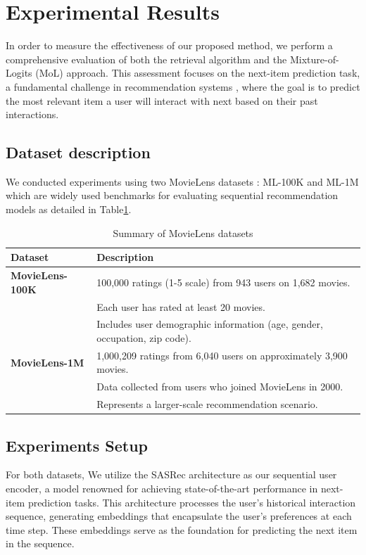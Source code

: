 \documentclass[Afour,sageh,times]{sagej}
\begin{document}
\section{Experimental Results}\label{sec3}
In order to measure the effectiveness of our proposed method, we perform a comprehensive evaluation of both the retrieval algorithm and the Mixture-of-Logits (MoL) approach. This assessment focuses on the next-item prediction task, a fundamental challenge in recommendation systems \cite{Zhu_2018} \cite{kang2018selfattentivesequentialrecommendation}, where the goal is to predict the most relevant item a user will interact with next based on their past interactions. 
\subsection{Dataset description}
We conducted experiments using two MovieLens datasets : ML-100K and ML-1M \cite{Harper2015}which are widely used benchmarks for evaluating sequential recommendation models as detailed in Table\ref{tab:movielens}.
\begin{table}[h]
	\centering
	\renewcommand{\arraystretch}{1.2}
	\begin{tabular}{|l|p{5cm}|}
		\hline
		\textbf{Dataset} & \textbf{Description} \\
		\hline
		\textbf{MovieLens-100K} & 100,000 ratings (1-5 scale) from 943 users on 1,682 movies. \\
		& Each user has rated at least 20 movies. \\
		& Includes user demographic information (age, gender, occupation, zip code). \\
		\hline
		\textbf{MovieLens-1M} & 1,000,209 ratings from 6,040 users on approximately 3,900 movies. \\
		& Data collected from users who joined MovieLens in 2000. \\
		& Represents a larger-scale recommendation scenario. \\
		\hline
	\end{tabular}
	\caption{Summary of MovieLens datasets}
	\label{tab:movielens}
\end{table}
\subsection{ Experiments Setup }
For both datasets, We utilize the SASRec architecture as our sequential user encoder, a model renowned for achieving state-of-the-art performance in next-item prediction tasks. This architecture processes the user's historical interaction sequence, generating embeddings that encapsulate the user's preferences at each time step. These embeddings serve as the foundation for predicting the next item in the sequence.
\end{document}
